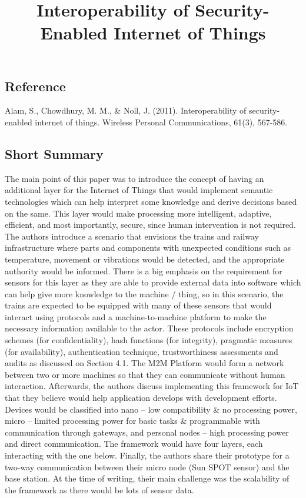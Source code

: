\documentclass[11pt,a4paper]{article}
\title{Interoperability of Security-Enabled Internet of Things}
\author{}
\date{}
\begin{document}
\maketitle

\subsection*{Reference}
Alam, S., Chowdhury, M. M., \& Noll, J. (2011). Interoperability of security-enabled internet of things. Wireless Personal Communications, 61(3), 567-586.

\subsection*{Short Summary} 
The main point of this paper was to introduce the concept of having an additional layer for the Internet of Things that would implement semantic technologies which can help interpret some knowledge and derive decisions based on the same. This layer would make processing more intelligent, adaptive, efficient, and most importantly, secure, since human intervention is not required. The authors introduce a scenario that envisions the trains and railway infrastructure where parts and components with unexpected conditions such as temperature, movement or vibrations would be detected, and the appropriate authority would be informed. There is a big emphasis on the requirement for sensors for this layer as they are able to provide external data into software which can help give more knowledge to the machine / thing, so in this scenario, the trains are expected to be equipped with many of these sensors that would interact using protocols and a machine-to-machine platform to make the necessary information available to the actor. These protocols include encryption schemes (for confidentiality), hash functions (for integrity), pragmatic measures (for availability), authentication technique, trustworthiness assessments and audits as discussed on Section 4.1. The M2M Platform would form a network between two or more machines so that they can communicate without human interaction. Afterwards, the authors discuss implementing this framework for IoT that they believe would help application develops with development efforts. Devices would be classified into nano – low compatibility \& no processing power, micro – limited processing power for basic tasks \& programmable with communication through gateways, and personal nodes – high processing power and direct communication. The framework would have four layers, each interacting with the one below. Finally, the authors share their prototype for a two-way communication between their micro node (Sun SPOT sensor) and the base station. At the time of writing, their main challenge was the scalability of the framework as there would be lots of sensor data. 
\end{document}
